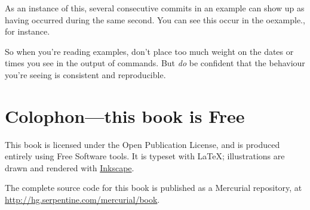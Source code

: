 As an instance of this, several consecutive commits in an example can
show up as having occurred during the same second.  You can see this
occur in the oexample.,
for instance.

So when you're reading examples, don't place too much weight on the
dates or times you see in the output of commands.  But \emph{do} be
confident that the behaviour you're seeing is consistent and
reproducible.

\section{Colophon---this book is Free}

This book is licensed under the Open Publication License, and is
produced entirely using Free Software tools.  It is typeset with
\LaTeX{}; illustrations are drawn and rendered with
\href{http://www.inkscape.org/}{Inkscape}.

The complete source code for this book is published as a Mercurial
repository, at \url{http://hg.serpentine.com/mercurial/book}.

